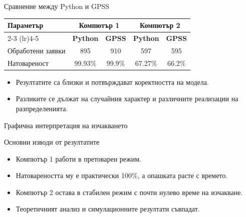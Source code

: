 \documentclass[aspectratio=169]{beamer}
\begin{document}
\begin{frame}{Сравнение между Python и GPSS}
    \begin{table}
        \centering
        \begin{tabular}{lcccc}
            \toprule
            \textbf{Параметър} & \multicolumn{2}{c}{\textbf{Компютър 1}} & \multicolumn{2}{c}{\textbf{Компютър 2}} \\
            \cmidrule(lr){2-3} \cmidrule(lr){4-5}
             & \textbf{Python} & \textbf{GPSS} & \textbf{Python} & \textbf{GPSS} \\
            \midrule
            Обработени заявки & 895 & 910 & 597 & 595 \\
            Натовареност & 99.93\% & 99.9\% & 67.27\% & 66.2\% \\
            \bottomrule
        \end{tabular}
    \end{table}

    \vspace{0.3cm}

    \begin{itemize}
        \item Резултатите са близки и потвърждават коректността на модела.
        \item Разликите се дължат на случайния характер и различните реализации на разпределенията.
    \end{itemize}
\end{frame}

\begin{frame}{Графична интерпретация на изчакването}
    \centering
\end{frame}

\begin{frame}{Основни изводи от резултатите}
    \begin{itemize}
        \item Компютър 1 работи в претоварен режим.
        \item Натовареността му е практически 100\%, а опашката расте с времето.
        \item Компютър 2 остава в стабилен режим с почти нулево време на изчакване.
        \item Теоретичният анализ и симулационните резултати съвпадат.
    \end{itemize}
\end{frame}
\end{document}
